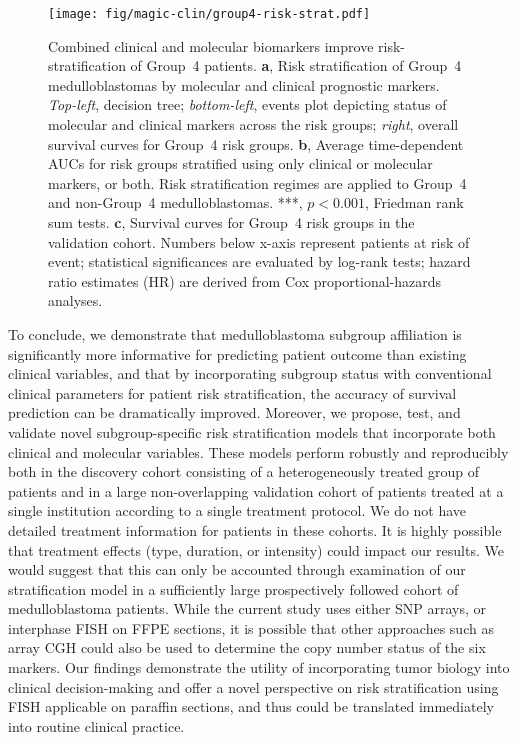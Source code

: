 \documentclass[11pt,letterpaper]{article}
\theoremstyle{definition}
\begin{document}
\begin{figure}[h]
	\begin{center}
		\texttt{[image: fig/magic-clin/group4-risk-strat.pdf]}
	\end{center}
	\caption[Combined clinical and molecular biomarkers improve risk-stratification of Group~4 patients]
	{Combined clinical and molecular biomarkers improve risk-stratification of Group~4 patients.
	\textbf{a}, Risk stratification of Group~4 medulloblastomas by molecular and clinical prognostic markers. \emph{Top-left}, decision tree; \emph{bottom-left}, events plot depicting status of molecular and clinical markers across the risk groups; \emph{right}, overall survival curves for Group~4 risk groups.
	\textbf{b}, Average time-dependent AUCs for risk groups stratified using only clinical or molecular markers, or both. Risk stratification regimes are applied to Group~4 and non-Group~4 medulloblastomas. ***, $p < 0.001$, Friedman rank sum tests.
	\textbf{c}, Survival curves for Group~4 risk groups in the validation cohort. 
	Numbers below x-axis represent patients at risk of event; statistical significances are evaluated by log-rank tests; hazard ratio estimates (HR) are derived from Cox proportional-hazards analyses.
	}
	\label{fig:group4-risk-strat}
\end{figure}

\clearpage


To conclude, we demonstrate that medulloblastoma subgroup affiliation is significantly more informative for predicting patient outcome than existing clinical variables, and that by incorporating subgroup status with conventional clinical parameters for patient risk stratification, the accuracy of survival prediction can be dramatically improved.  Moreover, we propose, test, and validate novel subgroup-specific risk stratification models that incorporate both clinical and molecular variables.  These models perform robustly and reproducibly both in the discovery cohort consisting of a heterogeneously treated group of patients and in a large non-overlapping validation cohort of patients treated at a single institution according to a single treatment protocol.  We do not have detailed treatment information for patients in these cohorts.  It is highly possible that treatment effects (type, duration, or intensity) could impact our results.  We would suggest that this can only be accounted through examination of our stratification model in a sufficiently large prospectively followed cohort of medulloblastoma patients.  While the current study uses either SNP arrays, or interphase FISH on FFPE sections, it is possible that other approaches such as array CGH could also be used to determine the copy number status of the six markers.  Our findings demonstrate the utility of incorporating tumor biology into clinical decision-making and offer a novel perspective on risk stratification using FISH applicable on paraffin sections, and thus could be translated immediately into routine clinical practice.
\end{document}
